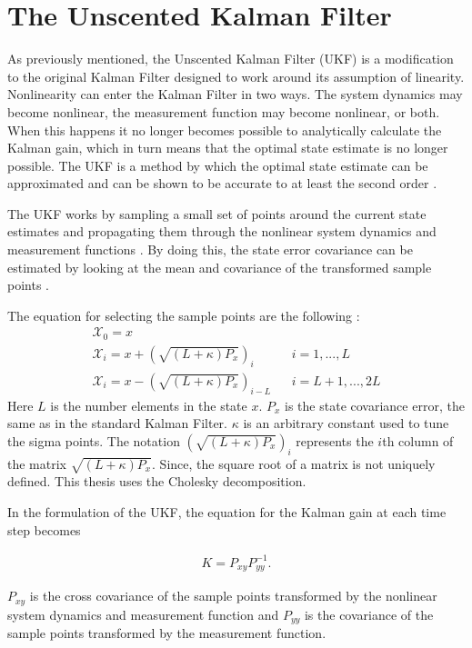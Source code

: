\section{The Unscented Kalman Filter}

As previously mentioned, the Unscented Kalman Filter (UKF) is a modification to the original Kalman Filter designed to work around its assumption of linearity. Nonlinearity can enter the Kalman Filter in two ways. The system dynamics may become nonlinear, the measurement function may become nonlinear, or both. When this happens it no longer becomes possible to analytically calculate the Kalman gain, which in turn means that the optimal state estimate is no longer possible. The UKF is a method by which the optimal state estimate can be approximated and can be shown to be accurate to at least the second order \cite{ukf_merwe}.

The UKF works by sampling a small set of points around the current state estimates and propagating them through the nonlinear system dynamics and measurement functions \cite{ukf_merwe}. By doing this, the state error covariance can be estimated by looking at the mean and covariance of the transformed sample points \cite{ukf_merwe}.



The equation for selecting the sample points are the following \cite{Julier_sigma}:
\begin{align}
\mathcal{X}_0 = x \\
\mathcal{X}_i = x + (\sqrt{(L + \kappa)P_x})_i && i = 1,...,L \\
\mathcal{X}_i = x - (\sqrt{(L + \kappa)P_x})_{i-L} && i = L+1,...,2L
\end{align}
Here $L$ is the number elements in the state $x$. $P_x$ is the state covariance error, the same as in the standard Kalman Filter. $\kappa$ is an arbitrary constant used to tune the sigma points. The notation $(\sqrt{(L + \kappa)P_x})_i$ represents the $i$th column of the matrix $\sqrt{(L + \kappa)P_x}$. Since, the square root of a matrix is not uniquely defined. This thesis uses the Cholesky decomposition.

In the formulation of the UKF, the equation for the Kalman gain at each time step becomes \cite{ukf_merwe}

\begin{align}
K = P_{xy}P^{-1}_{yy}.
\end{align}

$P_{xy}$ is the cross covariance of the sample points transformed by the nonlinear system dynamics and measurement function and $P_{yy}$ is the covariance of the sample points transformed by the measurement function.

